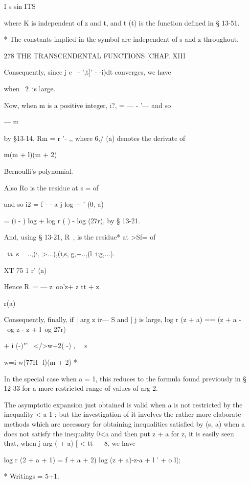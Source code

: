 {{I s sin ITS \

where K is independent of z and t, and t (t) is the function defined
in § 13-51.

* The constants implied in the symbol are independent of s and z
throughout.



278 THE TRANSCENDENTAL FUNCTIONS [CHAP. XIII

Consequently, since j e~ - ',t]' - -i)dt converges, we have

when \ 2\ is large.

Now, when m is a positive integer, i?, = — - '— and so

— m

by §13-14, Rm = r '- ,, where 6,/ (a) denotes the derivate of

m(m + l)(m + 2)

Bernoulli's polynomial.

Also Ro is the residue at s = of

and so i2 = f - - a j log + ' (0, a)

= (i - ) log + log r ( ) - log (27r), by § 13-21.

And, using § 13-21, R\ , is the residue* at >Sf= of

\ ia\ s=\ ..,(i, >...),(i,s, g,+..,(l\ i:g,...).

XT 75 1 r' (a)

Hence R\ = — z\ oo'z+ z tt + z.

r(a)

Consequently, finally, if | arg z ir— S and | j is large, log r (z +
a) == (z + a -~ \ og z - z + l\ og 27r)

+ i (-)"'~ </>w+2( -) , \ \ s

w=i w(77H- l)(m + 2) *

In the special case when a = 1, this reduces to the formula found
previously in § 12-33 for a more restricted range of values of arg 2.

The asymptotic expansion just obtained is valid when a is not
restricted by the inequality < a 1 ; but the investigation of it
involves the rather more elaborate methods which are necessary for
obtaining inequalities satisfied by (s, a) when a does not satisfy the
inequality 0<a%
and then put z + a for z, it is easily seen that, when j arg ( + a) [
< tt — 8, we have

log r (2 + a + 1) = f + a + 2) log (z + a)-z-a + l ' + o l);

* Writings = 5+1.



}}
